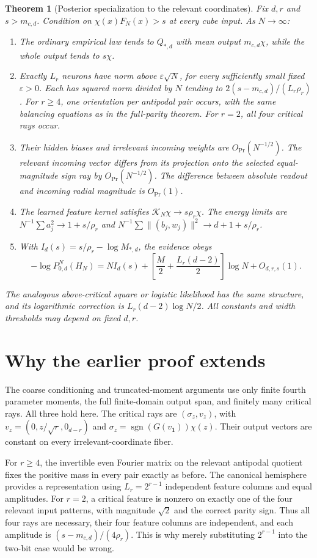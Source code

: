 \documentclass[11pt]{article}
\newtheorem{theorem}{Theorem}\newtheorem{lemma}[theorem]{Lemma}
\begin{document}
\begin{theorem}[Posterior specialization to the relevant coordinates]
Fix $d,r$ and $s>m_{c,d}$. Condition on $\chi(x)F_N(x)>s$ at every
cube input. As $N\to\infty$:
\begin{enumerate}
\item The ordinary empirical law tends to $Q_{*,d}$ with mean output
$m_{c,d}\chi$, while the whole output tends to $s\chi$.
\item Exactly $L_r$ neurons have norm above $\varepsilon\sqrt N$,
for every sufficiently small fixed $\varepsilon>0$. Each has squared
norm divided by $N$ tending to $2(s-m_{c,d})/(L_r\rho_r)$.
For $r\ge4$, one orientation per antipodal pair occurs, with the same
balancing equations as in the full-parity theorem. For $r=2$, all four
critical rays occur.
\item Their hidden biases and irrelevant incoming weights are
$O_{\Pr}(N^{-1/2})$. The relevant incoming vector differs from its
projection onto the selected equal-magnitude sign ray by
$O_{\Pr}(N^{-1/2})$. The difference between absolute readout and
incoming radial magnitude is $O_{\Pr}(1)$.
\item The learned feature kernel satisfies
$\mathcal K_N\chi\to s\rho_r\chi$.
The energy limits are $N^{-1}\sum a_j^2\to1+s/\rho_r$ and
$N^{-1}\sum\|(b_j,w_j)\|^2\to d+1+s/\rho_r$.
\item With $I_d(s)=s/\rho_r-\log M_{*,d}$, the evidence obeys
\[
 -\log P_{0,d}^N(H_N)=NI_d(s)+
 \left[\frac M2+\frac{L_r(d-2)}2\right]\log N+O_{d,r,s}(1).
\]
\end{enumerate}
The analogous above-critical square or logistic likelihood has the same
structure, and its logarithmic correction is $L_r(d-2)\log N/2$.
All constants and width thresholds may depend on fixed $d,r$.
\end{theorem}

\section{Why the earlier proof extends}
The coarse conditioning and truncated-moment arguments use only finite
fourth parameter moments, the full finite-domain output span, and finitely
many critical rays. All three hold here. The critical rays are
$(\sigma_z,v_z)$, with
$v_z=(0,z/\sqrt r,0_{d-r})$ and
$\sigma_z=\operatorname{sgn}(G(v_{\boldsymbol1}))\chi(z)$.
Their output vectors are constant on every irrelevant-coordinate fiber.

For $r\ge4$, the invertible even Fourier matrix on the relevant
antipodal quotient fixes the positive mass in every pair exactly as
before. The canonical hemisphere provides a representation using
$L_r=2^{r-1}$ independent feature columns and equal amplitudes.
For $r=2$, a critical feature is nonzero on exactly one of the four
relevant input patterns, with magnitude $\sqrt2$ and the correct
parity sign. Thus all four rays are necessary, their four feature
columns are independent, and each amplitude is
$(s-m_{c,d})/(4\rho_r)$. This is why merely substituting
$2^{r-1}$ into the two-bit case would be wrong.
\end{document}
